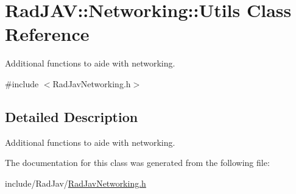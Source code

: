 \hypertarget{class_rad_j_a_v_1_1_networking_1_1_utils}{}\section{Rad\+J\+AV\+:\+:Networking\+:\+:Utils Class Reference}
\label{class_rad_j_a_v_1_1_networking_1_1_utils}


Additional functions to aide with networking.  




{\ttfamily \#include $<$Rad\+Jav\+Networking.\+h$>$}



\subsection{Detailed Description}
Additional functions to aide with networking. 

The documentation for this class was generated from the following file\+:\begin{DoxyCompactItemize}
\item 
include/\+Rad\+Jav/\hyperlink{_rad_jav_networking_8h}{Rad\+Jav\+Networking.\+h}\end{DoxyCompactItemize}
